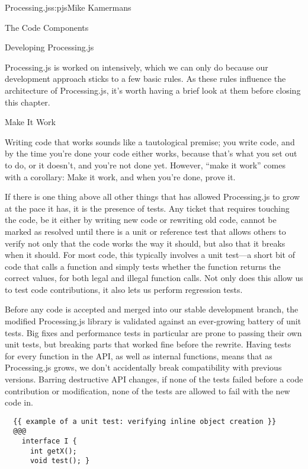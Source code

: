 \begin{aosachapter}{Processing.js}{s:pjs}{Mike Kamermans}
\begin{aosasect1}{The Code Components}
\end{aosasect1}

\begin{aosasect1}{Developing Processing.js}

Processing.js is worked on intensively, which we can only do because
our development approach sticks to a few basic rules. As these rules
influence the architecture of Processing.js, it's worth having a brief
look at them before closing this chapter.

\begin{aosasect2}{Make It Work}

Writing code that works sounds like a tautological premise; you write
code, and by the time you're done your code either works, because
that's what you set out to do, or it doesn't, and you're not done
yet. However, ``make it work'' comes with a corollary: Make it work, 
and when you're done, prove it.

If there is one thing above all other things that has allowed
Processing.js to grow at the pace it has, it is the presence of
tests. Any ticket that requires touching the code, be it either by
writing new code or rewriting old code, cannot be marked as resolved
until there is a unit or reference test that allows others to verify
not only that the code works the way it should, but also that it
breaks when it should. For most code, this typically involves a unit
test---a short bit of code that calls a function and simply tests
whether the function returns the correct values, for both legal and
illegal function calls. Not only does this allow us to test code
contributions, it also lets us perform regression tests.

Before any code is accepted and merged into our stable development
branch, the modified Processing.js library is validated against an
ever-growing battery of unit tests. Big fixes and performance tests in
particular are prone to passing their own unit tests, but 
breaking parts that worked fine before the rewrite. Having tests for
every function in the API, as well as internal functions, means that
as Processing.js grows, we don't accidentally break compatibility with
previous versions. Barring destructive API changes, if none of the
tests failed before a code contribution or modification, none of the
tests are allowed to fail with the new code in.

\begin{verbatim}
  {{ example of a unit test: verifying inline object creation }}
  @@@
    interface I {
      int getX();
      void test(); }


\end{verbatim}
\end{aosasect2}
\end{aosasect1}
\end{aosachapter}
